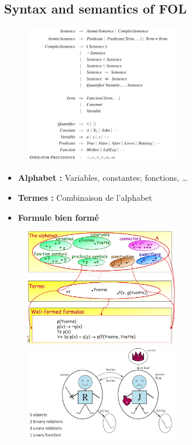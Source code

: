\documentclass[12pt]{article}
\begin{document}
	\subsection{Syntax and semantics of FOL}
		\begin{figure}[htp]	
			\centering
			\includegraphics[width=0.6\textwidth]{img/FOL.png}
		\end{figure}
		\begin{itemize}
			\item \textbf{Alphabet :} Variables, constantes; fonctions, \dots
			\item \textbf{Termes :} Combinaison de l'alphabet
			\item \textbf{Formule bien formé}
		\end{itemize}
		
		\begin{figure}[htp]	
			\centering
			\includegraphics[width=0.6\textwidth]{img/FOL1.png}
			\includegraphics[width=0.6\textwidth]{img/FOL2.png}

		\end{figure}
		
\end{document}
